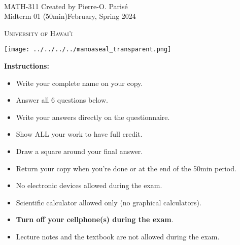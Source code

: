 \documentclass[addpoints, 12pt]{exam}%
\theoremstyle{definition}
\begin{document}
	\noindent \hrulefill \\
	\noindent MATH-311 \hfill Created by Pierre-O. Paris{\'e}\\
	Midterm 01 (50min)\hfill February, Spring 2024\\\vspace*{-0.7cm}

\noindent\hrulefill

\vspace*{0.5cm}

\begin{center}
\begin{minipage}{0.6\textwidth}
\begin{Huge}
\textsc{University of Hawai'i}
\end{Huge}
\end{minipage}
\begin{minipage}{0.12\textwidth}
\texttt{[image: ../../../../manoaseal\_transparent.png]}
\end{minipage}
\end{center}
	
\vspace*{0.5cm}

\noindent{}

\vspace*{0.5cm}

\noindent{}

\vspace*{1cm}

\begin{center}
\gradetable[h][questions]
\end{center}

\vspace*{1cm}

\noindent\textbf{Instructions:} 

\begin{itemize}
\item Write your complete name on your copy. 
\item Answer all 6 questions below.
\item Write your answers directly on the questionnaire.
\item Show ALL your work to have full credit.
\item Draw a square around your final answer.
\item Return your copy when you're done or at the end of the 50min period. 
\item No electronic devices allowed during the exam. 
\item Scientific calculator allowed only (no graphical calculators).
\item \textbf{Turn off your cellphone(s) during the exam}.
\item Lecture notes and the textbook are not allowed during the exam. 
\end{itemize}
\end{document}
